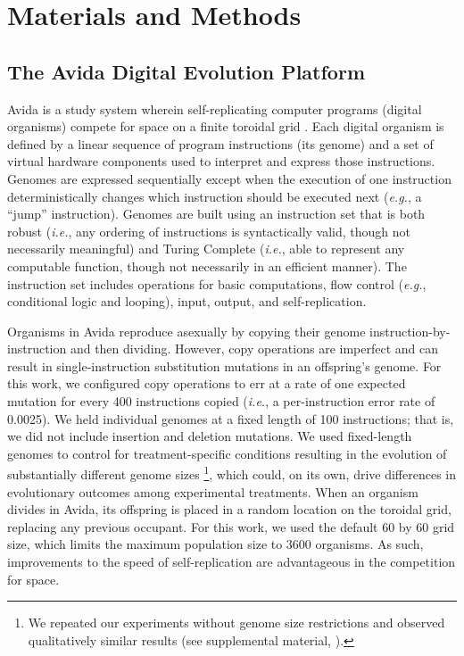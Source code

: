 \section{Materials and Methods}

\subsection{The Avida Digital Evolution Platform}

Avida is a study system wherein self-replicating computer programs (digital organisms) compete for space on a finite toroidal grid \citep{ofria_avida:_2009}.
Each digital organism is defined by a linear sequence of program instructions (its genome) and a set of virtual hardware components used to interpret and express those instructions. 
Genomes are expressed sequentially except when the execution of one instruction deterministically changes which instruction should be executed next (\textit{e.g.}, a ``jump'' instruction). 
Genomes are built using an instruction set that is both robust (\textit{i.e.}, any ordering of instructions is syntactically valid, though not necessarily meaningful) and Turing Complete (\textit{i.e.}, able to represent any computable function, though not necessarily in an efficient manner).
The instruction set includes operations for basic computations, flow control (\textit{e.g.}, conditional logic and looping), input, output, and self-replication.

Organisms in Avida reproduce asexually by copying their genome instruction-by-instruction and then dividing. 
However, copy operations are imperfect and can result in single-instruction substitution mutations in an offspring's genome. 
For this work, we configured copy operations to err at a rate of one expected mutation for every 400 instructions copied (\textit{i.e.}, a per-instruction error rate of 0.0025).
We held individual genomes at a fixed length of 100 instructions; that is, we did not include insertion and deletion mutations. 
We used fixed-length genomes to control for treatment-specific conditions resulting in the evolution of substantially different genome sizes \citep{consequences_of_plasticity_supplemental_material_2021}\footnote{
We repeated our experiments without genome size restrictions and observed qualitatively similar results (see supplemental material, \citealt{consequences_of_plasticity_supplemental_material_2021}).
}, which could, on its own, drive differences in evolutionary outcomes among experimental treatments.
When an organism divides in Avida, its offspring is placed in a random location on the toroidal grid, replacing any previous occupant.
For this work, we used the default 60 by 60 grid size, which limits the maximum population size to 3600 organisms.
As such, improvements to the speed of self-replication are advantageous in the competition for space.

